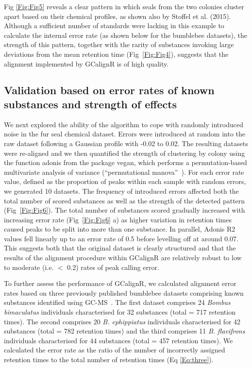 \documentclass[10pt,letterpaper]{article}
\begin{document}
Fig \ref{Fig:Fig5} reveals a clear pattern in which seals from the two colonies cluster apart based on their chemical profiles, as shown also by Stoffel et al. (2015). Although a sufficient number of standards were lacking in this example to calculate the internal error rate (as shown below for the bumblebee datasets), the strength of this pattern, together with the rarity of substances invoking large deviations from the mean retention time (Fig~\ref{Fig:Fig4}), suggests that the alignment implemented by GCalignR is of high quality.\par


\subsection*{Validation based on error rates of known substances and  strength of effects}

We next explored the ability of the algorithm to cope with randomly introduced noise in the fur seal chemical dataset.  Errors were introduced at random into the raw dataset following a Gaussian profile with -0.02 to 0.02.  The resulting datasets were re-aligned and we then quantified the strength of clustering by colony using the function adonis from the package vegan, which performs a permutation-based multivariate analysis of variance (“permutational manova”~\cite{Anderson.2001}). For each error rate value, defined as the proportion of peaks within each sample with random errors, we generated 10 datasets.  The frequency of introduced errors affected both the total number of scored substances as well as the strength of the detected pattern (Fig~\ref{Fig:Fig6}). The total number of substances scored gradually increased with increasing error rate (Fig~\ref{Fig:Fig6} a) as higher variation in retention times caused peaks to be split into more than one substance.  In parallel, Adonis R2 values fell linearly up to an error rate of 0.5 before levelling off at around 0.07. This suggests both that the original dataset is clearly structured and that the results of the alignment procedure within GCalignR are relatively robust to low to moderate (i.e. $<$ 0.2) rates of peak calling error.

To further assess the performance of GCalignR, we calculated alignment error rates based on three previously published bumblebee datasets comprising known substances identified using GC-MS~\cite{Dellicour.2013}. The first dataset comprises 24 \textit{Bombus bimaculatus} individuals characterised for 32 substances (total = 717 retention times).  The second comprises 20 \textit{B. ephippiatus} individuals characterised for 42 substances (total = 782 retention times) and the third comprises 11 \textit{B. flavifrons} individuals characterised for 44 substances (total = 457 retention times). We calculated the error rate as the ratio of the number of incorrectly assigned retention times to the total number of retention times (Eq \eqref{Eq:three}).
\end{document}

